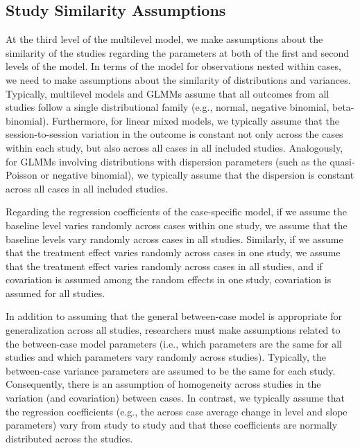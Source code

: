 \documentclass[
]{book}
\begin{document}
\hypertarget{study-similarity-assumptions}{%
\subsection{Study Similarity Assumptions}\label{study-similarity-assumptions}}

At the third level of the multilevel model, we make assumptions about the similarity of the studies regarding the parameters at both of the first and second levels of the model.
In terms of the model for observations nested within cases, we need to make assumptions about the similarity of distributions and variances.
Typically, multilevel models and GLMMs assume that all outcomes from all studies follow a single distributional family (e.g., normal, negative binomial, beta-binomial).
Furthermore, for linear mixed models, we typically assume that the session-to-session variation in the outcome is constant not only across the cases within each study, but also across all cases in all included studies.
Analogously, for GLMMs involving distributions with dispersion parameters (such as the quasi-Poisson or negative binomial), we typically assume that the dispersion is constant across all cases in all included studies.

Regarding the regression coefficients of the case-specific model, if we assume the baseline level varies randomly across cases within one study, we assume that the baseline levels vary randomly across cases in all studies.
Similarly, if we assume that the treatment effect varies randomly across cases in one study, we assume that the treatment effect varies randomly across cases in all studies, and if covariation is assumed among the random effects in one study, covariation is assumed for all studies.

In addition to assuming that the general between-case model is appropriate for generalization across all studies, researchers must make assumptions related to the between-case model parameters (i.e., which parameters are the same for all studies and which parameters vary randomly across studies).
Typically, the between-case variance parameters are assumed to be the same for each study. Consequently, there is an assumption of homogeneity across studies in the variation (and covariation) between cases.
In contrast, we typically assume that the regression coefficients (e.g., the across case average change in level and slope parameters) vary from study to study and that these coefficients are normally distributed across the studies.
\end{document}
